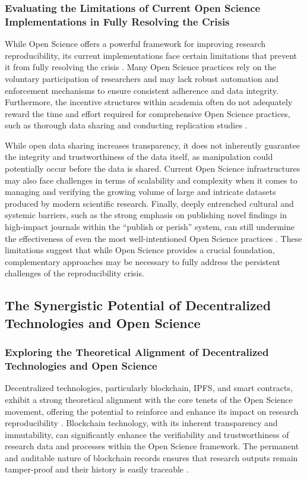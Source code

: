 \documentclass{article}
\begin{document}
\subsubsection{Evaluating the Limitations of Current Open Science Implementations in Fully Resolving the Crisis}

While Open Science offers a powerful framework for improving research reproducibility, its current implementations face certain limitations that prevent it from fully resolving the crisis \cite{fecher2014open}. Many Open Science practices rely on the voluntary participation of researchers and may lack robust automation and enforcement mechanisms to ensure consistent adherence and data integrity. Furthermore, the incentive structures within academia often do not adequately reward the time and effort required for comprehensive Open Science practices, such as thorough data sharing and conducting replication studies \cite{fecher2014open}.

While open data sharing increases transparency, it does not inherently guarantee the integrity and trustworthiness of the data itself, as manipulation could potentially occur before the data is shared. Current Open Science infrastructures may also face challenges in terms of scalability and complexity when it comes to managing and verifying the growing volume of large and intricate datasets produced by modern scientific research. Finally, deeply entrenched cultural and systemic barriers, such as the strong emphasis on publishing novel findings in high-impact journals within the ``publish or perish'' system, can still undermine the effectiveness of even the most well-intentioned Open Science practices \cite{fecher2014open}. These limitations suggest that while Open Science provides a crucial foundation, complementary approaches may be necessary to fully address the persistent challenges of the reproducibility crisis.

\subsection{The Synergistic Potential of Decentralized Technologies and Open Science}

\subsubsection{Exploring the Theoretical Alignment of Decentralized Technologies and Open Science}

Decentralized technologies, particularly blockchain, IPFS, and smart contracts, exhibit a strong theoretical alignment with the core tenets of the Open Science movement, offering the potential to reinforce and enhance its impact on research reproducibility \cite{benet2014ipfs}. Blockchain technology, with its inherent transparency and immutability, can significantly enhance the verifiability and trustworthiness of research data and processes within the Open Science framework. The permanent and auditable nature of blockchain records ensures that research outputs remain tamper-proof and their history is easily traceable \cite{benet2014ipfs}.
\end{document}
